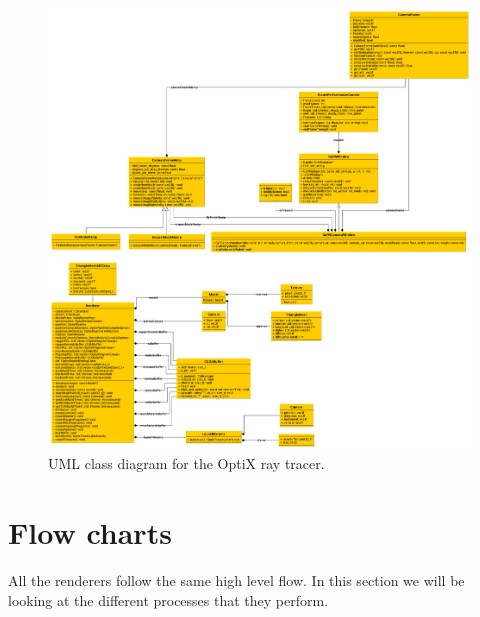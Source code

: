 \begin{figure}[hbt!]
  \centering
  \includegraphics[width=\textwidth]{figuras/optix-uml.png}
  \caption{UML class diagram for the OptiX ray tracer.}
  \label{optix-uml}
\end{figure}

\clearpage
\section{Flow charts}
All the renderers follow the same high level flow. In this section we will be looking at the different processes that they perform. 


